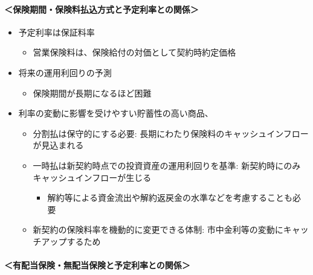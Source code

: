 \documentclass[]{article}
\begin{document}
\hypertarget{ux4fddux967aux671fux9593ux4fddux967aux6599ux6255ux8fbcux65b9ux5f0fux3068ux4e88ux5b9aux5229ux7387ux3068ux306eux95a2ux4fc2}{%
\paragraph{＜保険期間・保険料払込方式と予定利率との関係＞}\label{ux4fddux967aux671fux9593ux4fddux967aux6599ux6255ux8fbcux65b9ux5f0fux3068ux4e88ux5b9aux5229ux7387ux3068ux306eux95a2ux4fc2}}

\begin{itemize}
\tightlist
\item
  予定利率は保証料率

  \begin{itemize}
  \tightlist
  \item
    営業保険料は、保険給付の対価として契約時約定価格
  \end{itemize}
\item
  将来の運用利回りの予測

  \begin{itemize}
  \tightlist
  \item
    保険期間が長期になるほど困難
  \end{itemize}
\item
  利率の変動に影響を受けやすい貯蓄性の高い商品、

  \begin{itemize}
  \tightlist
  \item
    分割払は保守的にする必要:
    長期にわたり保険料のキャッシュインフローが見込まれる
  \item
    一時払は新契約時点での投資資産の運用利回りを基準:
    新契約時にのみキャッシュインフローが生じる

    \begin{itemize}
    \tightlist
    \item
      解約等による資金流出や解約返戻金の水準などを考慮することも必要
    \end{itemize}
  \item
    新契約の保険料率を機動的に変更できる体制:
    市中金利等の変動にキャッチアップするため
  \end{itemize}
\end{itemize}

\hypertarget{ux6709ux914dux5f53ux4fddux967aux7121ux914dux5f53ux4fddux967aux3068ux4e88ux5b9aux5229ux7387ux3068ux306eux95a2ux4fc2}{%
\paragraph{＜有配当保険・無配当保険と予定利率との関係＞}\label{ux6709ux914dux5f53ux4fddux967aux7121ux914dux5f53ux4fddux967aux3068ux4e88ux5b9aux5229ux7387ux3068ux306eux95a2ux4fc2}}
\end{document}
